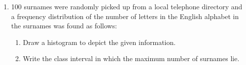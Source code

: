 \renewcommand{\theequation}{\theenumi}
\begin{enumerate}[label=\thesection.\arabic*.,ref=\thesection.\theenumi]
\item 100 surnames were randomly picked up from
a local telephone directory and a frequency
distribution of the number of letters in the
English alphabet in the surnames was found
as follows: 
\begin{table}[ht!]
\centering

\label{table:Q45}	
\end{table}
\begin{enumerate}
\item Draw a histogram to depict the given
information.
\item Write the class interval in which the
maximum number of surnames lie.
\end{enumerate}

\end{enumerate}
